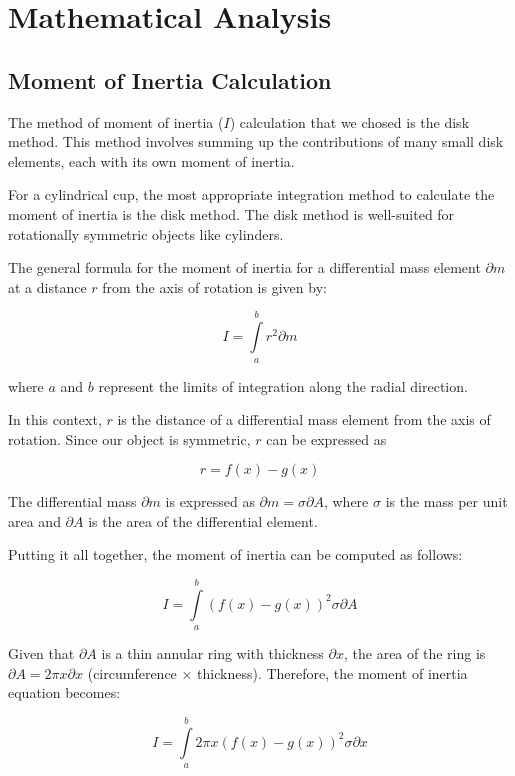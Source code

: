 \chapter{Mathematical Analysis}

\section{Moment of Inertia Calculation}

The method of moment of inertia ($I$) calculation that we chosed is the disk method. This method involves summing up the contributions of many small disk elements, each with its own moment of inertia. 

\bigbreak{}

For a cylindrical cup, the most appropriate integration method to calculate the moment of inertia is the disk method. The disk method is well-suited for rotationally symmetric objects like cylinders.

\bigbreak{}

The general formula for the moment of inertia for a differential mass element $\partial{m}$ at a distance $r$ from the axis of rotation is given by:

\[I = \int\limits_a^b r^2 \partial{m}\]

\noindent where $a$ and $b$ represent the limits of integration along the radial direction.

In this context, $r$ is the distance of a differential mass element from the axis of rotation. Since our object is symmetric, $r$ can be expressed as 

\[ r = f(x) - g(x)\]

The differential mass $\partial{m}$ is expressed as $\partial{m} = \sigma \partial{A}$, where $\sigma$ is the mass per unit area and $\partial{A}$ is the area of the differential element.

\bigbreak{}

Putting it all together, the moment of inertia can be computed as follows:

\[ I = \int\limits_{a}^{b} {\left(f(x) - g(x)\right)}^2\sigma\partial{A} \]

\newpage
\thispagestyle{plain}

Given that $\partial{A}$ is a thin annular ring with thickness $\partial{x}$, the area of the ring is $\partial{A} = 2\pi x\partial{x}$ (circumference $\times$ thickness). Therefore, the moment of inertia equation becomes:

\[ I = \int\limits_{a}^{b} 2\pi x {(f(x) - g(x))}^2\sigma\partial{x} \]

